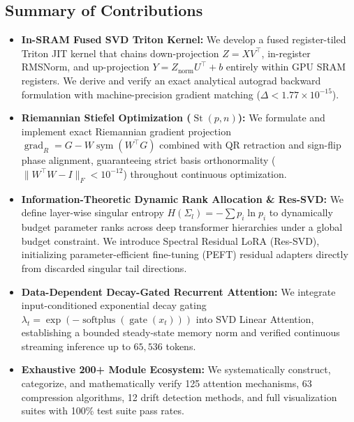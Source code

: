 \subsection{Summary of Contributions}
\begin{itemize}
    \item \textbf{In-SRAM Fused SVD Triton Kernel:} We develop a fused register-tiled Triton JIT kernel that chains down-projection $Z = X V^\top$, in-register RMSNorm, and up-projection $Y = Z_{\text{norm}} U^\top + b$ entirely within GPU SRAM registers. We derive and verify an exact analytical autograd backward formulation with machine-precision gradient matching ($\Delta < 1.77 \times 10^{-15}$).
    \item \textbf{Riemannian Stiefel Optimization ($\operatorname{St}(p, n)$):} We formulate and implement exact Riemannian gradient projection $\operatorname{grad}_R = G - W \operatorname{sym}(W^\top G)$ combined with QR retraction and sign-flip phase alignment, guaranteeing strict basis orthonormality ($\|W^\top W - I\|_F < 10^{-12}$) throughout continuous optimization.
    \item \textbf{Information-Theoretic Dynamic Rank Allocation \& Res-SVD:} We define layer-wise singular entropy $H(\Sigma_l) = -\sum p_i \ln p_i$ to dynamically budget parameter ranks across deep transformer hierarchies under a global budget constraint. We introduce Spectral Residual LoRA (Res-SVD), initializing parameter-efficient fine-tuning (PEFT) residual adapters directly from discarded singular tail directions.
    \item \textbf{Data-Dependent Decay-Gated Recurrent Attention:} We integrate input-conditioned exponential decay gating $\lambda_t = \exp(-\operatorname{softplus}(\operatorname{gate}(x_t)))$ into SVD Linear Attention, establishing a bounded steady-state memory norm and verified continuous streaming inference up to $65,536$ tokens.
    \item \textbf{Exhaustive 200+ Module Ecosystem:} We systematically construct, categorize, and mathematically verify 125 attention mechanisms, 63 compression algorithms, 12 drift detection methods, and full visualization suites with 100\% test suite pass rates.
\end{itemize}
